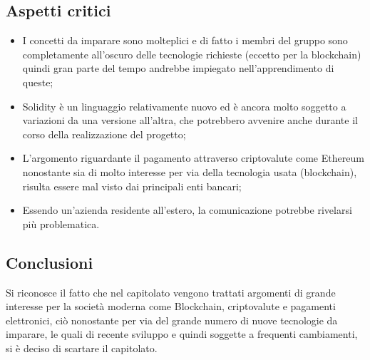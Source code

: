 \subsection{Aspetti critici}
\begin{itemize}
\item I concetti da imparare sono molteplici e di fatto i membri del gruppo sono completamente all'oscuro delle tecnologie richieste (eccetto per la blockchain) quindi gran parte del tempo andrebbe impiegato nell'apprendimento di queste;
\item Solidity \`e un linguaggio relativamente nuovo ed \`e  ancora molto soggetto a variazioni da una versione all'altra, che potrebbero avvenire anche durante il corso della realizzazione del progetto;
\item L'argomento riguardante il pagamento attraverso criptovalute come Ethereum nonostante sia di molto interesse per via della tecnologia usata (blockchain), risulta essere mal visto dai principali enti bancari;
\item Essendo un'azienda residente all'estero, la comunicazione potrebbe rivelarsi più problematica.
\end{itemize}
\subsection{Conclusioni}
Si riconosce il fatto che nel capitolato vengono trattati argomenti di grande interesse per la società moderna come Blockchain, criptovalute e pagamenti elettronici, ciò nonostante per via del grande numero di nuove tecnologie da imparare, le quali di recente sviluppo e quindi soggette a frequenti cambiamenti, si è deciso di scartare il capitolato.